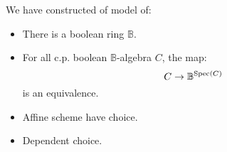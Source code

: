 We have constructed of model of:

\begin{itemize}
\item There is a boolean ring $\mathbb{B}$.
\item For all c.p. boolean $\mathbb{B}$-algebra $C$, the map:
\[C \to \mathbb{B}^{\operatorname{Spec}(C)}\]
is an equivalence.
\item Affine scheme have choice.
\item Dependent choice.
\end{itemize}